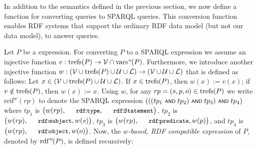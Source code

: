 In addition to the {\SPARQLplus} semantics defined in the previous section, we now define
	a function for converting {\SPARQLplus} queries to SPARQL queries. This conversion function
enables RDF systems that support the ordinary RDF data model (but not our {\RDFplus} data model), to answer {\SPARQLplus} queries.


Let $P$ be a {\SPARQLplus} expression.
	For converting $P$ to a SPARQL expression we
assume an  injective function $v : \mathrm{trefs}(P) \rightarrow \mathcal{V} \cap \mathrm{vars}^+\!(P)$. Furthermore, we introduce another injective function $w : (\mathcal{V} \cup \mathrm{trefs}(P) \cup \mathcal{U} \cup \mathcal{L}) \rightarrow (\mathcal{V} \cup \mathcal{U} \cup \mathcal{L})$ that is defined as follows: Let $x \in (\mathcal{V} \cup \mathrm{trefs}(P) \cup \mathcal{U} \cup \mathcal{L})$. If $x \in \mathrm{trefs}(P)$, then $w(x) := v(x)$; if $v \notin \mathrm{trefs}(P)$, then $w(x) := x$.
%
Using $w$, for any $rp = (s,p,o) \in \mathrm{trefs}(P)$ we write $\mathrm{reif}^w\!( rp )$ to denote
	the SPARQL expression $( ( ( tp_1 \text{ \normalfont\scriptsize\textsf{AND} } tp_2 ) \text{ \normalfont\scriptsize\textsf{AND} } tp_3 ) \text{ \normalfont\scriptsize\textsf{AND} } tp_4 )$ where $tp_1$ is $\bigl(w(rp),\mathTinyRDF{rdf\!:\!type},\mathTinyRDF{rdf\!:\!Statement}\bigr)$, $tp_2$ is $\bigl(w(rp),\mathTinyRDF{rdf\!:\!subject},w(s)\bigr)$, $tp_3$ is $\bigl(w(rp),\mathTinyRDF{rdf\!:\!predicate},w(p)\bigr)$, and $tp_4$ is $\bigl(w(rp),\mathTinyRDF{rdf\!:\!object},w(o)\bigr)$.
%
Now, the \emph{$w$-based, RDF compatible expression} of $P$, denoted by $\mathrm{rdf}^{w}\!(P)$, is defined recursively: %
